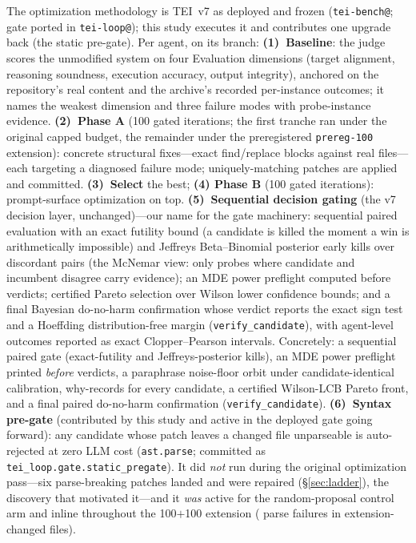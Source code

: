 \documentclass[11pt]{article}
\begin{document}
The optimization methodology is TEI~v7 as deployed and frozen
(\texttt{tei-bench@\swTeibenchSHA}; gate ported in
\texttt{tei-loop@\swTeiloopSHA}); this study executes it and contributes one
upgrade back (the static pre-gate). Per agent, on its branch:
\textbf{(1)~Baseline}: the judge scores the unmodified system on four
Evaluation dimensions (target alignment, reasoning soundness, execution
accuracy, output integrity), anchored on the repository's real content and the
archive's recorded per-instance outcomes; it names the weakest dimension and
three failure modes with probe-instance evidence. \textbf{(2)~Phase A}
(100 gated iterations; the first tranche ran under the original capped
budget, the remainder under the preregistered \texttt{prereg-100} extension):
concrete structural fixes---exact find/replace blocks against
real files---each targeting a diagnosed failure mode; uniquely-matching
patches are applied and committed. \textbf{(3)~Select} the best; \textbf{(4)
Phase B} (100 gated iterations): prompt-surface optimization on top.
\textbf{(5)~Sequential decision gating} (the v7 decision layer,
unchanged)---our name for the gate machinery: sequential paired evaluation
with an exact futility bound (a candidate is killed the moment a win is
arithmetically impossible) and Jeffreys Beta--Binomial posterior early kills
over discordant pairs (the McNemar view: only probes where candidate and
incumbent disagree carry evidence); an MDE power preflight computed before
verdicts; certified Pareto selection over Wilson lower confidence bounds;
and a final Bayesian do-no-harm confirmation whose verdict reports the exact
sign test and a Hoeffding distribution-free margin
(\texttt{verify\_candidate}), with agent-level outcomes reported as exact
Clopper--Pearson intervals. Concretely: a sequential paired gate
(exact-futility and Jeffreys-posterior kills), an MDE power preflight printed
\emph{before} verdicts, a paraphrase noise-floor orbit under
candidate-identical calibration, why-records for every candidate, a certified
Wilson-LCB Pareto front, and a final paired do-no-harm confirmation
(\texttt{verify\_candidate}). \textbf{(6)~Syntax pre-gate} (contributed by
this study and active in the deployed gate going forward): any candidate
whose patch leaves a changed file unparseable is auto-rejected at zero LLM
cost (\texttt{ast.parse}; committed as
\texttt{tei\_loop.gate.static\_pregate}). It did \emph{not} run during
the original optimization pass---six parse-breaking patches landed and were
repaired (\S\ref{sec:ladder}), the discovery that motivated it---and it
\emph{was} active for the random-proposal control arm and inline throughout
the 100$+$100 extension (\swSynExtFail{} parse failures in
\swSynExtChanged{} extension-changed files).
\end{document}
